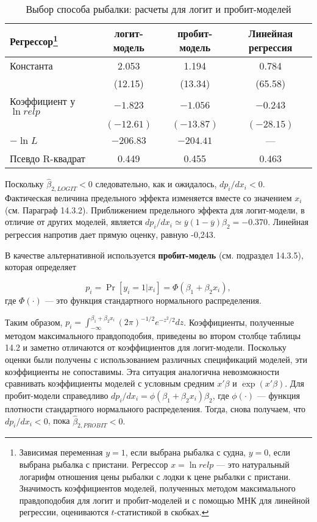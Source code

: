 \begin{table}[h]
\caption{\label{tab:fishlogit} Выбор способа рыбалки: расчеты для логит и пробит-моделей}
\begin{minipage}{17cm}
\begin{tabular}{lccc} 
\hline 
\hline
\textbf{Регрессор}\footnote{Зависимая переменная $y=1$,  если выбрана рыбалка с судна,  $y=0$,  если выбрана рыбалка с пристани. Регрессор $x=\ln relp$ --- это натуральный логарифм отношения цены рыбалки с лодки к цене рыбалки с пристани. Значимость коэффициентов моделей,  полученных методом максимального правдоподобия для логит и пробит-моделей и с помощью МНК для линейной регрессии,  оцениваются $t$-статистикой в скобках.} & \textbf{логит-модель} & \textbf{пробит-модель} & \textbf{Линейная регрессия} \\ 
\hline 
Константа & 2.053 & 1.194 & 0.784 \\ 
 & (12.15) & (13.34) & (65.58) \\
Коэффициент у $\ln relp$ & $-1.823$ & $-1.056$ & $-0.243$ \\  
 & $(-12.61)$ & $(-13.87)$ & $(-28.15)$ \\
$-\ln L$ & $-206.83$ & $-204.41$ & --- \\ 
Псевдо R-квадрат & 0.449 & 0.455 & 0.463 \\ 
\hline
\hline 
\end{tabular}
\end{minipage}
\end{table}
Поскольку $\widehat{\beta}_{2,LOGIT} < 0$ следовательно,  как и ожидалось,  $dp_i/dx_i<0$. Фактическая величина предельного эффекта изменяется вместе со значением $x_i$ (см. Параграф 14.3.2). Приближением предельного эффекта для логит-модели,  в отличие от других моделей,  является $dp_i/dx_i \simeq  \overline{y}\left(1-\overline{y}\right) \widehat{\beta}_2=-0.370$. Линейная регрессия напротив дает прямую оценку,  равную -0,243.

В качестве альтернативной используется \textbf{пробит-модель} (см. подраздел 14.3.5),  которая определяет

\[p_i=\Pr\left[y_i=1\left|x_i\right.\right]=\Phi \left(\beta_1+\beta_2x_i\right), \] 
где $\Phi (\cdot )$ --- это функция стандартного нормального распределения. 

Таким образом,  $p_i=\int^{\beta_1+\beta_2x_i}_{-\infty} \left(2\pi \right)^{-1/2} e^{-z^2/2}dz$. Коэффициенты,  полученные методом максимального правдоподобия,  приведены во втором столбце таблицы 14.2 и заметно отличаются от коэффициентов для логит-модели. Поскольку оценки были получены с использованием различных спецификаций моделей, эти коэффициенты не сопоставимы. Эта ситуация аналогична невозможности сравнивать коэффициенты моделей с условным средним $x'\beta $ и $\exp \left(x'\beta \right)$. Для пробит-модели справедливо $dp_i/dx_i =\phi\left(\beta_1+\beta_2x_i\right)\beta_2$,  где $\phi (\cdot )$ --- функция плотности стандартного нормального распределения. Тогда,  снова получаем,  что $dp_i /dx_i<0$,  пока $\widehat{\beta}_{2, PROBIT} < 0.$

